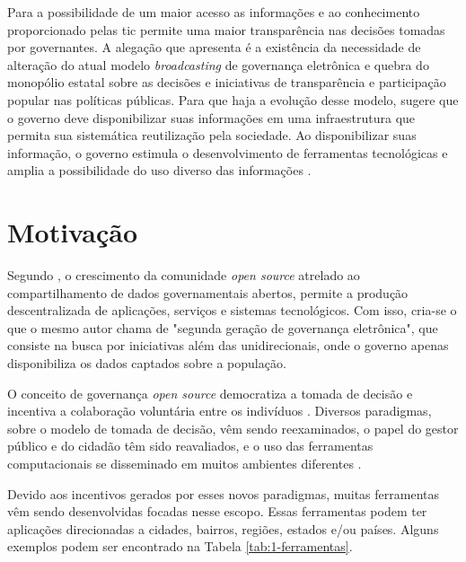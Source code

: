 \vspace{0.3CM}
\par
Para \cite{braga2016participaccao} a possibilidade de um maior acesso as informações e ao conhecimento proporcionado pelas \acrshort{tic}
permite uma maior transparência nas decisões tomadas por governantes. A alegação que \cite{vaz2017transformaccoes} apresenta é a existência da necessidade de alteração do atual modelo
\textit{broadcasting} de governança eletrônica e quebra do monopólio estatal sobre as decisões e iniciativas de transparência e participação popular nas políticas públicas.
Para que haja a evolução desse modelo, \cite{o2011government} sugere que o governo deve disponibilizar suas informações em uma infraestrutura que permita sua sistemática reutilização
pela sociedade. Ao disponibilizar suas informação, o governo estimula o desenvolvimento de ferramentas tecnológicas e amplia a possibilidade 
do uso diverso das informações \cite{zuiderwijk2012socio}.

\section{Motivação}
\label{sec:motivacao}
Segundo \cite{vaz2017transformaccoes}, o crescimento da comunidade \textit{open source} atrelado ao compartilhamento de dados governamentais abertos, permite a produção
descentralizada de aplicações, serviços e sistemas tecnológicos. Com isso, cria-se o que o mesmo autor chama de "segunda geração de governança eletrônica", que consiste na busca
por iniciativas além das unidirecionais, onde o governo apenas disponibiliza os dados captados sobre a população.

\par
O conceito de governança \textit{open source} democratiza a tomada de decisão e incentiva a colaboração voluntária entre os indivíduos \cite{rushkoff2003open}.
Diversos paradigmas, sobre o modelo de tomada de decisão, vêm sendo reexaminados, o papel do gestor público e do cidadão têm sido reavaliados,
e o uso das ferramentas computacionais se disseminado em muitos ambientes diferentes \cite{medeiros2009novos}.

\par
Devido aos incentivos gerados por esses novos paradigmas, muitas ferramentas vêm sendo desenvolvidas focadas nesse escopo.
Essas ferramentas podem ter aplicações direcionadas a cidades, bairros, regiões, estados e/ou países.  
Alguns exemplos podem ser encontrado na Tabela \ref{tab:1-ferramentas}.

